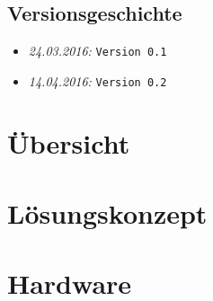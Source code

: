 \documentclass{fhnwreport/fhnwreport}
\begin{document}


\tableofcontents
\vspace{60mm}
\subsection*{Versionsgeschichte}
\begin{itemize}
    \item[]
        \emph{24.03.2016:} \texttt{Version 0.1}
	\item[]
        \emph{14.04.2016:} \texttt{Version 0.2}
\end{itemize}
\clearpage

\section{\"Ubersicht}
\label{sec:ubersicht}


%

\clearpage
\section{L\"osungskonzept}
\label{sec:losungskonzept}


\clearpage
\section{Hardware}
\label{sec:hardware}

\end{document}
